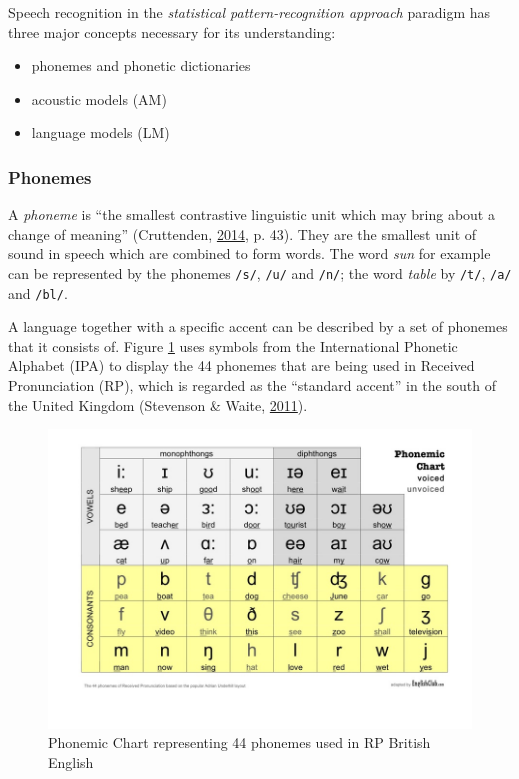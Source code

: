\documentclass[]{article}
\providecommand{\tightlist}{%
  \setlength{\itemsep}{0pt}\setlength{\parskip}{0pt}}
\begin{document}
Speech recognition in the \emph{statistical pattern-recognition
approach} paradigm has three major concepts necessary for its
understanding:

\begin{itemize}
\tightlist
\item
  phonemes and phonetic dictionaries
\item
  acoustic models (AM)
\item
  language models (LM)
\end{itemize}

\subsubsection{Phonemes}\label{phonemes}

A \emph{phoneme} is ``the smallest contrastive linguistic unit which may
bring about a change of meaning'' (Cruttenden,
\hyperref[ref-cruttenden2014gimson]{2014}, p. 43). They are the smallest
unit of sound in speech which are combined to form words. The word
\emph{sun} for example can be represented by the phonemes \texttt{/s/},
\texttt{/u/} and \texttt{/n/}; the word \emph{table} by \texttt{/t/},
\texttt{/a/} and \texttt{/bl/}.

A language together with a specific accent can be described by a set of
phonemes that it consists of. Figure \ref{phonemic-chart} uses symbols
from the International Phonetic Alphabet (IPA) to display the 44
phonemes that are being used in Received Pronunciation (RP), which is
regarded as the ``standard accent'' in the south of the United Kingdom
(Stevenson \& Waite, \hyperref[ref-stevenson2011concise]{2011}).

\begin{figure}[htbp]
\centering
\includegraphics{images/phonemes_50.jpg}
\caption{Phonemic Chart representing 44 phonemes used in RP British
English\label{phonemic-chart}}
\end{figure}
\end{document}
